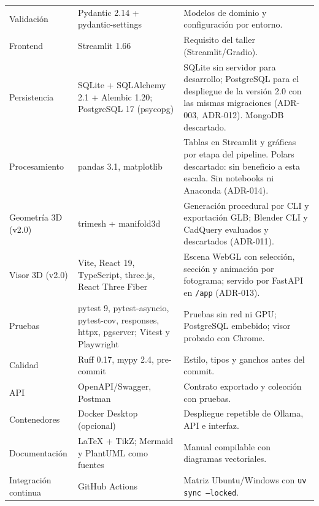 \begin{longtable}{@{}P{2.8cm}P{3.4cm}P{9.0cm}@{}}
Validación & Pydantic 2.14 + pydantic-settings & Modelos de dominio y configuración por entorno.\\
Frontend & Streamlit 1.66 & Requisito del taller (Streamlit/Gradio).\\
Persistencia & SQLite + SQLAlchemy 2.1 + Alembic 1.20; PostgreSQL 17 (psycopg) & SQLite sin servidor para desarrollo; PostgreSQL para el despliegue de la versión 2.0 con las mismas migraciones (ADR-003, ADR-012). MongoDB descartado.\\
Procesamiento & pandas 3.1, matplotlib & Tablas en Streamlit y gráficas por etapa del pipeline. Polars descartado: sin beneficio a esta escala. Sin notebooks ni Anaconda (ADR-014).\\
Geometría 3D (v2.0) & trimesh + manifold3d & Generación procedural por CLI y exportación GLB; Blender CLI y CadQuery evaluados y descartados (ADR-011).\\
Visor 3D (v2.0) & Vite, React 19, TypeScript, three.js, React Three Fiber & Escena WebGL con selección, sección y animación por fotograma; servido por FastAPI en \texttt{/app} (ADR-013).\\
Pruebas & pytest 9, pytest-asyncio, pytest-cov, responses, httpx, pgserver; Vitest y Playwright & Pruebas sin red ni GPU; PostgreSQL embebido; visor probado con Chrome.\\
Calidad & Ruff 0.17, mypy 2.4, pre-commit & Estilo, tipos y ganchos antes del commit.\\
API & OpenAPI/Swagger, Postman & Contrato exportado y colección con pruebas.\\
Contenedores & Docker Desktop (opcional) & Despliegue repetible de Ollama, API e interfaz.\\
Documentación & LaTeX + TikZ; Mermaid y PlantUML como fuentes & Manual compilable con diagramas vectoriales.\\
Integración continua & GitHub Actions & Matriz Ubuntu/Windows con \texttt{uv sync --locked}.\\\bottomrule
\end{longtable}
